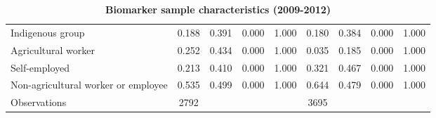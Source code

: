 \begin{table}[h!]
\begin{center}
{\begin{tabular}{l*{2}{cccc}}
Indigenous group    &       0.188&       0.391&       0.000&       1.000&       0.180&       0.384&       0.000&       1.000\\
Agricultural worker &       0.252&       0.434&       0.000&       1.000&       0.035&       0.185&       0.000&       1.000\\
Self-employed       &       0.213&       0.410&       0.000&       1.000&       0.321&       0.467&       0.000&       1.000\\
Non-agricultural worker or employee&       0.535&       0.499&       0.000&       1.000&       0.644&       0.479&       0.000&       1.000\\
\midrule
Observations        &        2792&            &            &            &        3695&            &            &            \\
\bottomrule
\end{tabular} }
\caption{\label{tab:Biomarker-sample-characteristics}\textbf{Biomarker sample characteristics
(2009-2012) }}
\end{center}
\end{table}  
  
  
  
  
  
  
  
  
  
  
  
  
  
  
  
  
  
  
  
  
  
  
  
  
  
  
  
  
  
  